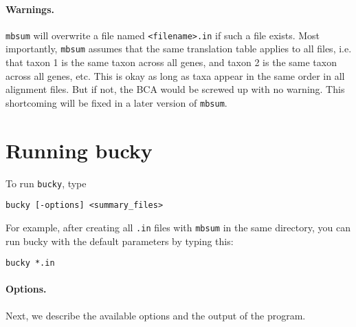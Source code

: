 \documentclass[12pt,english,final,letterpaper]{article}
\begin{document}
\paragraph{Warnings.}  
{\tt mbsum} will overwrite a file named \verb+<filename>.in+
if such a file exists.
Most importantly, \texttt{mbsum} assumes that the same 
translation table applies to all files, i.e. that taxon 1
is the same taxon across all genes, and taxon 2 is the same
taxon across all genes, etc. This is okay as long as taxa
appear in the same order in all alignment files. But if not, 
the BCA would be screwed up with no warning. 
This shortcoming will be fixed in a later version of
\texttt{mbsum}. 


\section{Running bucky}
To run {\tt bucky}, type
\begin{verbatim}
bucky [-options] <summary_files> 
\end{verbatim}
For example, after creating all {\tt .in} files with {\tt mbsum} in the same 
directory, you can run bucky with the default parameters by typing this:
\begin{verbatim}
bucky *.in
\end{verbatim}

\paragraph{Options.} Next, we describe the available options and the output 
of the program. 
\bigskip
\end{document}
